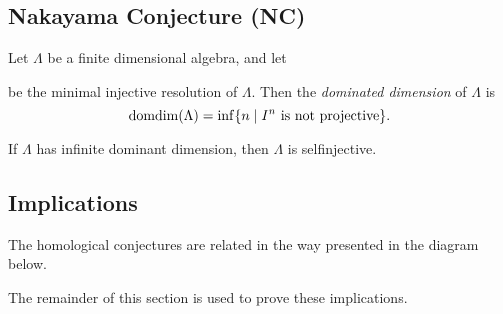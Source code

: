 \subsection*{Nakayama Conjecture (NC)}

\begin{defn}
	Let $\Lambda$ be a finite dimensional algebra, and let
	\begin{center}
	\end{center}
	be the minimal injective resolution of $\Lambda$. Then the \emph{dominated dimension} of $\Lambda$ is $$\operatorname{domdim}(\Lambda) = \inf\{n \; | \; I^n\text{ is not projective} \}.$$
\end{defn}

\begin{conj} 
	If $\Lambda$ has infinite dominant dimension, then $\Lambda$ is selfinjective.
\end{conj}

\subsection{Implications}
The homological conjectures are related in the way presented in the diagram below.


The remainder of this section is used to prove these implications.

